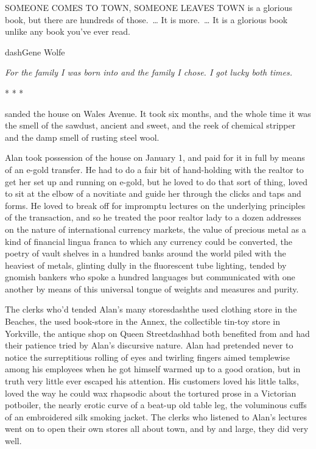 \newpage
\noindent
SOMEONE COMES TO TOWN, SOMEONE LEAVES TOWN is a glorious book, but
there are hundreds of those.~\ldots{}  It is more.~\ldots{}  It is a glorious
book unlike any book you've ever read.

{\hfill dash{}Gene Wolfe}

\bigskip

\noindent
\textit{For the family I was born into and the family I chose.  I got lucky
both times.}

\begin{center}
* * *
\end{center}

 sanded the house on Wales Avenue.  It took six months, and the
whole time it was the smell of the sawdust, ancient and sweet, and the
reek of chemical stripper and the damp smell of rusting steel wool.

Alan took possession of the house on January 1, and paid for it in
full by means of an e-gold transfer.  He had to do a fair bit of
hand-holding with the realtor to get her set up and running on e-gold,
but he loved to do that sort of thing, loved to sit at the elbow of a
novitiate and guide her through the clicks and taps and forms.  He
loved to break off for impromptu lectures on the underlying principles
of the transaction, and so he treated the poor realtor lady to a dozen
addresses on the nature of international currency markets, the value
of precious metal as a kind of financial lingua franca to which any
currency could be converted, the poetry of vault shelves in a hundred
banks around the world piled with the heaviest of metals, glinting
dully in the fluorescent tube lighting, tended by gnomish bankers who
spoke a hundred languages but communicated with one another by means
of this universal tongue of weights and measures and purity.

The clerks who'd tended Alan's many storesdash{}the used clothing store
in the Beaches, the used book-store in the Annex, the collectible
tin-toy store in Yorkville, the antique shop on Queen Streetdash{}had
both benefited from and had their patience tried by Alan's discursive
nature.  Alan had pretended never to notice the surreptitious rolling
of eyes and twirling fingers aimed templewise among his employees when
he got himself warmed up to a good oration, but in truth very little
ever escaped his attention.  His customers loved his little talks,
loved the way he could wax rhapsodic about the tortured prose in a
Victorian potboiler, the nearly erotic curve of a beat-up old table
leg, the voluminous cuffs of an embroidered silk smoking jacket.  The
clerks who listened to Alan's lectures went on to open their own
stores all about town, and by and large, they did very well.

